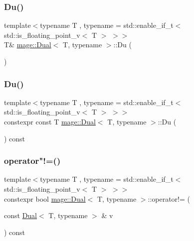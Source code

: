 \subsubsection{\texorpdfstring{Du()}{Du()}\hspace{0.1cm}{\footnotesize\ttfamily [1/2]}}
{\footnotesize\ttfamily template$<$typename T , typename  = std\+::enable\+\_\+if\+\_\+t$<$ std\+::is\+\_\+floating\+\_\+point\+\_\+v$<$ T $>$ $>$$>$ \\
T\& \mbox{\hyperlink{structmage_1_1_dual}{mage\+::\+Dual}}$<$ T, typename $>$\+::Du (\begin{DoxyParamCaption}{ }\end{DoxyParamCaption})\hspace{0.3cm}{\ttfamily [noexcept]}}

\mbox{\label{structmage_1_1_dual_ae4d1ed542602eb767a17ae3619c2fb4b}} 
\subsubsection{\texorpdfstring{Du()}{Du()}\hspace{0.1cm}{\footnotesize\ttfamily [2/2]}}
{\footnotesize\ttfamily template$<$typename T , typename  = std\+::enable\+\_\+if\+\_\+t$<$ std\+::is\+\_\+floating\+\_\+point\+\_\+v$<$ T $>$ $>$$>$ \\
constexpr const T \mbox{\hyperlink{structmage_1_1_dual}{mage\+::\+Dual}}$<$ T, typename $>$\+::Du (\begin{DoxyParamCaption}{ }\end{DoxyParamCaption}) const\hspace{0.3cm}{\ttfamily [noexcept]}}

\mbox{\label{structmage_1_1_dual_ad0e5e31fc17187a56b2b0f7664fed411}} 
\subsubsection{\texorpdfstring{operator"!=()}{operator!=()}}
{\footnotesize\ttfamily template$<$typename T , typename  = std\+::enable\+\_\+if\+\_\+t$<$ std\+::is\+\_\+floating\+\_\+point\+\_\+v$<$ T $>$ $>$$>$ \\
constexpr bool \mbox{\hyperlink{structmage_1_1_dual}{mage\+::\+Dual}}$<$ T, typename $>$\+::operator!= (\begin{DoxyParamCaption}\item[{const \mbox{\hyperlink{structmage_1_1_dual}{Dual}}$<$ T, typename $>$ \&}]{v }\end{DoxyParamCaption}) const}

